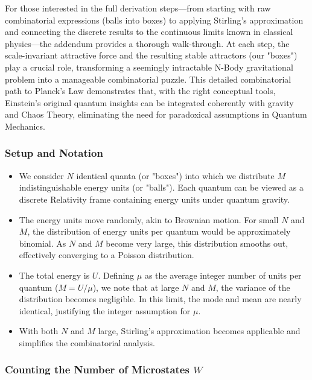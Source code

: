 \documentclass{report}
\begin{document}
For those interested in the full derivation steps—from starting with raw combinatorial expressions (balls into boxes) to applying Stirling’s approximation and connecting the discrete results to the continuous limits known in classical physics—the addendum provides a thorough walk-through. At each step, the scale-invariant attractive force and the resulting stable attractors (our "boxes") play a crucial role, transforming a seemingly intractable N-Body gravitational problem into a manageable combinatorial puzzle. This detailed combinatorial path to Planck’s Law demonstrates that, with the right conceptual tools, Einstein’s original quantum insights can be integrated coherently with gravity and Chaos Theory, eliminating the need for paradoxical assumptions in Quantum Mechanics.

\subsubsection*{Setup and Notation}

\begin{itemize}
    \item We consider $N$ identical quanta (or "boxes") into which we distribute $M$ indistinguishable energy units (or "balls"). Each quantum can be viewed as a discrete Relativity frame containing energy units under quantum gravity.
    \item The energy units move randomly, akin to Brownian motion. For small $N$ and $M$, the distribution of energy units per quantum would be approximately binomial. As $N$ and $M$ become very large, this distribution smooths out, effectively converging to a Poisson distribution.
    \item The total energy is $U$. Defining $\mu$ as the average integer number of units per quantum ($M=U/\mu$), we note that at large $N$ and $M$, the variance of the distribution becomes negligible. In this limit, the mode and mean are nearly identical, justifying the integer assumption for $\mu$.
    \item With both $N$ and $M$ large, Stirling’s approximation becomes applicable and simplifies the combinatorial analysis.
\end{itemize}


\subsubsection*{Counting the Number of Microstates $W$}
\end{document}
